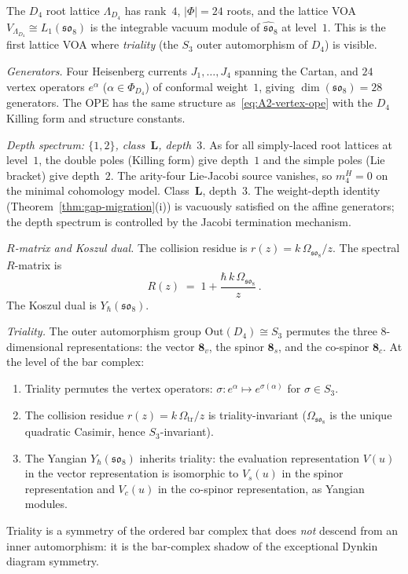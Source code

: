 \begin{computation}%
\label{comp:lattice-voa-D4-ordered-bar}%
%
%
%
The $D_4$ root lattice $\Lambda_{D_4}$ has rank~$4$,
$|\Phi| = 24$ roots, and the lattice VOA
$V_{\Lambda_{D_4}} \cong L_1(\mathfrak{so}_8)$ is the
integrable vacuum module of $\widehat{\mathfrak{so}}_8$ at
level~$1$. This is the first lattice VOA where \emph{triality}
(the $S_3$ outer automorphism of $D_4$) is visible.

\smallskip
\noindent
\emph{Generators.}
Four Heisenberg currents $J_1, \ldots, J_4$ spanning the Cartan,
and $24$ vertex operators $e^\alpha$ ($\alpha \in \Phi_{D_4}$) of
conformal weight~$1$, giving $\dim(\mathfrak{so}_8) = 28$ generators.
The OPE has the same structure as~\eqref{eq:A2-vertex-ope}
with the $D_4$ Killing form and structure constants.

\smallskip
\noindent
\emph{Depth spectrum: $\{1,2\}$, class~$\mathbf{L}$, depth~$3$.}
As for all simply-laced root lattices at level~$1$, the double
poles (Killing form) give depth~$1$ and the simple poles
(Lie bracket) give depth~$2$. The arity-four Lie-Jacobi source
vanishes, so \(m_4^H=0\) on the minimal cohomology model.
Class~$\mathbf{L}$, depth~$3$.
The weight-depth identity (Theorem~\ref{thm:gap-migration}(i)) is vacuously satisfied on the affine generators; the depth spectrum is controlled by the Jacobi termination mechanism.

\smallskip
\noindent
\emph{$R$-matrix and Koszul dual.}
The collision residue is $r(z) = k\,\Omega_{\mathfrak{so}_8}/z$.
The spectral $R$-matrix is
\begin{equation}\label{eq:D4-lattice-R}
R(z) \;=\; 1 + \frac{\hbar\,k\,\Omega_{\mathfrak{so}_8}}{z}\,.
\end{equation}
The Koszul dual is $Y_\hbar(\mathfrak{so}_8)$.

\smallskip
\noindent
\emph{Triality.}
The outer automorphism group $\mathrm{Out}(D_4) \cong S_3$
permutes the three $8$-dimensional representations:
the vector $\mathbf{8}_v$, the spinor $\mathbf{8}_s$, and
the co-spinor $\mathbf{8}_c$. At the level of the bar complex:
\begin{enumerate}[label=\textup{(\roman*)},nosep]
\item Triality permutes the vertex operators:
 $\sigma \colon e^{\alpha} \mapsto e^{\sigma(\alpha)}$
 for $\sigma \in S_3$.
\item The collision residue $r(z) = k\,\Omega_{\mathrm{tr}}/z$ is triality-invariant
 ($\Omega_{\mathfrak{so}_8}$ is the unique quadratic
 Casimir, hence $S_3$-invariant).
\item The Yangian $Y_\hbar(\mathfrak{so}_8)$ inherits triality:
 the evaluation representation $V(u)$ in the vector
 representation is isomorphic to $V_s(u)$ in the spinor
 representation and $V_c(u)$ in the co-spinor representation,
 as Yangian modules.
\end{enumerate}
Triality is a symmetry of the ordered bar complex that does
\emph{not} descend from an inner automorphism: it is the
bar-complex shadow of the exceptional Dynkin diagram symmetry.


\end{computation}
